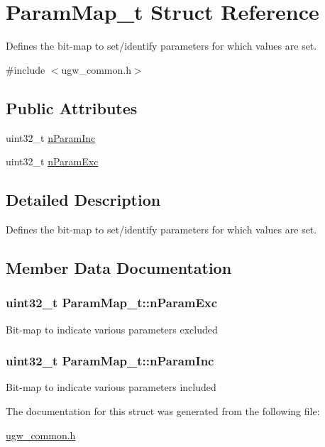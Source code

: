 \hypertarget{structParamMap__t}{\section{Param\-Map\-\_\-t Struct Reference}
\label{structParamMap__t}
}


Defines the bit-\/map to set/identify parameters for which values are set.  




{\ttfamily \#include $<$ugw\-\_\-common.\-h$>$}

\subsection*{Public Attributes}
\begin{DoxyCompactItemize}
\item 
uint32\-\_\-t \hyperlink{structParamMap__t_ae3063cc84993cd6d6e79aee82aaf1891}{n\-Param\-Inc}
\item 
uint32\-\_\-t \hyperlink{structParamMap__t_a1090a97475ebe9b49695eb1f11f55356}{n\-Param\-Exc}
\end{DoxyCompactItemize}


\subsection{Detailed Description}
Defines the bit-\/map to set/identify parameters for which values are set. 

\subsection{Member Data Documentation}
\hypertarget{structParamMap__t_a1090a97475ebe9b49695eb1f11f55356}{
\subsubsection[{n\-Param\-Exc}]{\setlength{\rightskip}{0pt plus 5cm}uint32\-\_\-t Param\-Map\-\_\-t\-::n\-Param\-Exc}}\label{structParamMap__t_a1090a97475ebe9b49695eb1f11f55356}
Bit-\/map to indicate various parameters excluded \hypertarget{structParamMap__t_ae3063cc84993cd6d6e79aee82aaf1891}{
\subsubsection[{n\-Param\-Inc}]{\setlength{\rightskip}{0pt plus 5cm}uint32\-\_\-t Param\-Map\-\_\-t\-::n\-Param\-Inc}}\label{structParamMap__t_ae3063cc84993cd6d6e79aee82aaf1891}
Bit-\/map to indicate various parameters included 

The documentation for this struct was generated from the following file\-:\begin{DoxyCompactItemize}
\item 
\hyperlink{ugw__common_8h}{ugw\-\_\-common.\-h}\end{DoxyCompactItemize}
